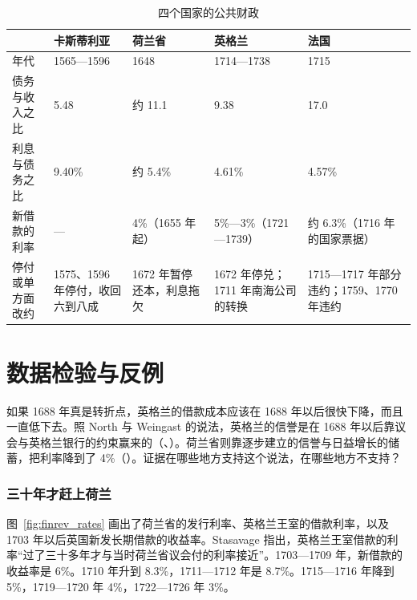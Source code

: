 \begin{table}[htbp]\centering\small
\caption{四个国家的公共财政}\label{tab:finrev-four}
\begin{tabularx}{\linewidth}{@{}l Y Y Y Y@{}}
\toprule
 & 卡斯蒂利亚 & 荷兰省 & 英格兰 & 法国 \\\midrule
年代 & 1565—1596 & 1648 & 1714—1738 & 1715 \\
债务与收入之比 & 5.48 & 约 11.1 & 9.38 & 17.0 \\
利息与债务之比 & 9.40\% & 约 5.4\% & 4.61\% & 4.57\% \\
新借款的利率 & — & 4\%（1655 年起） & 5\%—3\%（1721—1739） & 约 6.3\%（1716 年的国家票据） \\
停付或单方面改约 & 1575、1596 年停付，收回六到八成 & 1672 年暂停还本，利息拖欠 & 1672 年停兑；1711 年南海公司的转换 & 1715—1717 年部分违约；1759、1770 年违约 \\
\bottomrule
\end{tabularx}
\end{table}

\section{数据检验与反例}\label{sec:finrev-test}

如果 1688 年真是转折点，英格兰的借款成本应该在 1688 年以后很快下降，而且一直低下去。照 North 与 Weingast 的说法，英格兰的信誉是在 1688 年以后靠议会与英格兰银行的约束赢来的（、）。荷兰省则靠逐步建立的信誉与日益增长的储蓄，把利率降到了 4\%（）。证据在哪些地方支持这个说法，在哪些地方不支持？

\subsubsection{三十年才赶上荷兰}
图~\ref{fig:finrev_rates} 画出了荷兰省的发行利率、英格兰王室的借款利率，以及 1703 年以后英国新发长期借款的收益率。Stasavage 指出，英格兰王室借款的利率“过了三十多年才与当时荷兰省议会付的利率接近”\cite{stasavage2002}。1703—1709 年，新借款的收益率是 6\%。1710 年升到 8.3\%，1711—1712 年是 8.7\%。1715—1716 年降到 5\%，1719—1720 年 4\%，1722—1726 年 3\%\cite{boe2017}。

